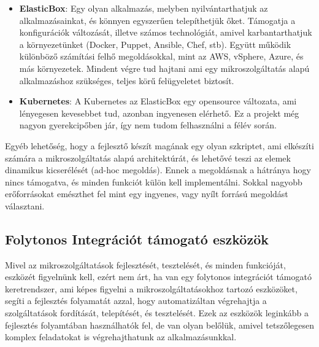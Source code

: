 \documentclass[11pt,magyar,a4paper,twoside,]{report}
\begin{document}
\begin{itemize}
\item
  \textbf{ElasticBox}\citep{elasticbox}: Egy olyan alkalmazás, melyben
  nyilvántarthatjuk az alkalmazásainkat, és könnyen egyszerűen
  telepíthetjük őket. Támogatja a konfigurációk változását, illetve
  számos technológiát, amivel karbantarthatjuk a környezetünket (Docker,
  Puppet, Ansible, Chef, stb). Együtt működik különböző számítási felhő
  megoldásokkal, mint az AWS, vSphere, Azure, és más környezetek.
  Mindent végre tud hajtani ami egy mikroszolgáltatás alapú
  alkalmazáshoz szükséges, teljes körű felügyeletet biztosít.
  \citep{jenkins-elasticbox}
\item
  \textbf{Kubernetes}\citep{kubernetes}: A Kubernetes az ElasticBox egy
  opensource változata, ami lényegesen kevesebbet tud, azonban
  ingyenesen elérhető. Ez a projekt még nagyon gyerekcipőben jár, így
  nem tudom felhasználni a félév során.
\end{itemize}

Egyéb lehetőség, hogy a fejlesztő készít magának egy olyan szkriptet,
ami elkészíti számára a mikroszolgáltatás alapú architektúrát, és
lehetővé teszi az elemek dinamikus kicserélését (ad-hoc megoldás). Ennek
a megoldásnak a hátránya hogy nincs támogatva, és minden funkciót külön
kell implementálni. Sokkal nagyobb erőforrásokat emészthet fel mint egy
ingyenes, vagy nyílt forrású megoldást választani.

\subsection{Folytonos Integrációt támogató
eszközök}\label{folytonos-integruxe1ciuxf3t-tuxe1mogatuxf3-eszkuxf6zuxf6k}

Mivel az mikroszolgáltatások fejlesztését, tesztelését, és minden
funkcióját, eszközét figyelnünk kell, ezért nem árt, ha van egy
folytonos integrációt támogató keretrendszer, ami képes figyelni a
mikroszolgáltatásokhoz tartozó eszközöket, segíti a fejlesztés
folyamatát azzal, hogy automatizáltan végrehajtja a szolgáltatások
fordítását, telepítését, és tesztelését. Ezek az eszközök leginkább a
fejlesztés folyamtában használhatók fel, de van olyan belőlük, amivel
tetszőlegesen komplex feladatokat is végrehajthatunk az
alkalmazásunkkal.
\end{document}

